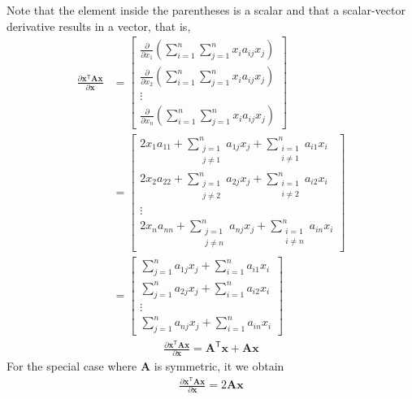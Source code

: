\documentclass{article}
\newcommand{\trans}{\mathsf{T}}
\begin{document}
Note that the element inside the parentheses is a scalar and that a scalar-vector derivative results in a vector, that is,
\begin{align}
    \frac{\partial \mathbf{x}^\trans \mathbf{A} \mathbf{x}}{\partial \mathbf{x}} &= \begin{bmatrix}
        \displaystyle \frac{\partial}{\partial x_1} \left( \sum_{i = 1}^{n}\sum_{j = 1}^{n} x_{i} a_{ij} x_{j} \right) \\ 
        \displaystyle  \frac{\partial}{\partial x_2} \left( \sum_{i = 1}^{n}\sum_{j = 1}^{n} x_{i} a_{ij} x_{j} \right) \\ 
        \vdots \\ 
        \displaystyle \frac{\partial}{\partial x_n} \left( \sum_{i = 1}^{n}\sum_{j = 1}^{n} x_{i} a_{ij} x_{j} \right) 
    \end{bmatrix} \\
    & = \begin{bmatrix}
        \displaystyle 2x_1a_{11} + \sum_{\substack{j = 1 \\ j \neq 1}}^{n} a_{1j} x_{j} + \sum_{\substack{i = 1 \\ i \neq 1}}^{n} a_{i1} x_{i} \\
        \displaystyle 2x_2a_{22} + \sum_{\substack{j = 1 \\ j \neq 2}}^{n} a_{2j} x_{j} + \sum_{\substack{i = 1 \\ i \neq 2}}^{n} a_{i2} x_{i} \\
        \vdots \\
        \displaystyle 2x_na_{nn} + \sum_{\substack{j = 1 \\ j \neq n}}^{n} a_{nj} x_{j} + \sum_{\substack{i = 1 \\ i \neq n}}^{n} a_{in} x_{i} 
    \end{bmatrix} \\
    &= \begin{bmatrix}
        \displaystyle \sum_{j = 1}^{n} a_{1j} x_{j} + \sum_{i = 1}^{n} a_{i1} x_{i} \\
        \displaystyle \sum_{j = 1}^{n} a_{2j} x_{j} + \sum_{i = 1}^{n} a_{i2} x_{i} \\
        \vdots \\
        \displaystyle \sum_{j = 1}^{n} a_{nj} x_{j} + \sum_{i = 1}^{n} a_{in} x_{i} 
    \end{bmatrix}
\end{align}
\begin{align}
    \boxed{\frac{\partial \mathbf{x}^\trans \mathbf{A} \mathbf{x}}{\partial \mathbf{x}} = \mathbf{A}^\trans \mathbf{x} + \mathbf{A} \mathbf{x}}
\end{align}
For the special case where \(\mathbf{A}\) is symmetric, it we obtain
\begin{align}
    \boxed{\frac{\partial \mathbf{x}^\trans \mathbf{A} \mathbf{x}}{\partial \mathbf{x}} = 2\mathbf{A} \mathbf{x}}
\end{align}
\end{document}
